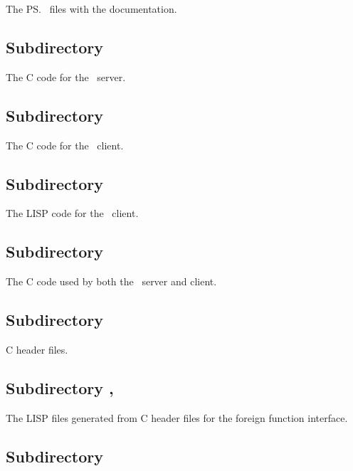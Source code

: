 The \ps\ files with the documentation.

\subsection*{Subdirectory
  \protect{}}

The C code for the \plob\ server.

\subsection*{Subdirectory
  \protect{}}

The C code for the \plob\ client.

\subsection*{Subdirectory
  \protect{}}

The LISP code for the \plob\ client.

\subsection*{Subdirectory
  \protect{}}

The C code used by both the \plob\ server and client.

\subsection*{Subdirectory
  \protect{}}

C header files.

\subsection*{Subdirectory
  \protect{},
  }

The LISP files generated from C header files for the foreign function
interface.

\subsection*{Subdirectory
  \protect{}}


